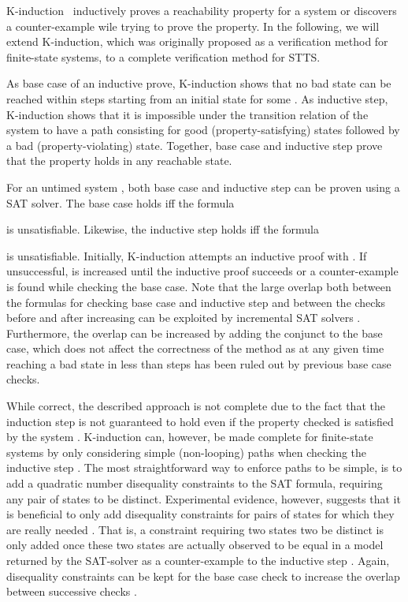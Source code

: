 \iffalse K-induction \tocite\ inductively proves a reachability property for a system or discovers a counter-example wile trying to prove the property. In the following, we will extend K-induction, which was originally proposed as a verification method for finite-state systems, to a complete verification method for STTS.

As base case of an inductive prove, K-induction shows that no bad state can be reached within  steps starting from an initial state for some . As inductive step, K-induction shows that it is impossible under the transition relation of the system to have a path consisting for  good (property-satisfying) states followed by a bad (property-violating) state. Together, base case and inductive step prove that the property holds in any reachable state.

For an untimed system , both base case and inductive step can be proven using a SAT solver. The base case holds iff the formula

is unsatisfiable. Likewise, the inductive step holds iff the formula

is unsatisfiable.
Initially, K-induction attempts an inductive proof with . If unsuccessful,  is increased until the inductive proof succeeds or a counter-example is found while checking the base case.
Note that the large overlap both between the formulas for checking base case and inductive step and between the checks before and after increasing  can be exploited by incremental SAT solvers \tocite.
 Furthermore, the overlap can be increased by adding the conjunct  to the base case, which does not affect the correctness of the method as at any given time reaching a bad state in less than  steps has been ruled out by previous base case checks.


While correct, the described approach is not complete due to the fact that the induction step is not guaranteed to hold even if the property checked is satisfied by the system \tocite. K-induction can, however, be made complete for finite-state systems by only considering simple (non-looping) paths when checking the inductive step \tocite.
The most straightforward way to enforce paths to be simple, is to add a quadratic number disequality constraints to the SAT formula, requiring any pair of states to be distinct. Experimental evidence, however, suggests that it is beneficial to only add disequality constraints for pairs of states for which they are really needed \tocite. That is, a constraint requiring two states two be distinct is only added once these two states are actually observed to be equal in a model returned by the SAT-solver as a counter-example to the inductive step \tocite.
Again, disequality constraints can be kept for the base case check to increase the overlap between successive checks \tocite .

